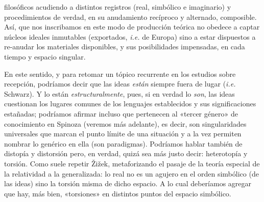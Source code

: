 filosóficos acudiendo a distintos registros (real, simbólico e imaginario) y procedimientos de verdad, en su anudamiento recíproco y alternado, composible. Así, que nos inscribamos en este modo de producción teórica no obedece a captar núcleos ideales inmutables (exportados, \emph{i.e.} de Europa) sino a estar dispuestos a re-anudar los materiales disponibles, y sus posibilidades impensadas, en cada tiempo y espacio singular.

En este sentido, y para retomar un tópico recurrente en los estudios sobre recepción, podríamos decir que las ideas \emph{están} siempre fuera de lugar (\emph{i.e.} Schwarz). Y lo están \emph{estructuralmente}, pues, si en verdad lo \emph{son}, las ideas cuestionan los lugares comunes de los lenguajes establecidos y sus significaciones estañadas; podríamos afirmar incluso que pertenecen al «tercer género» de conocimiento en Spinoza (veremos más adelante), es decir, son singularidades universales que marcan el punto límite de una situación y a la vez permiten nombrar lo genérico en ella (son paradigmas). Podríamos hablar también de distopía y distorsión pero, en verdad, quizá sea más justo decir: heterotopía y torsión. Como suele repetir Žižek, metaforizando el pasaje de la teoría especial de la relatividad a la generalizada: lo real no es un agujero en el orden simbólico (de las ideas) sino la torsión misma de dicho espacio. A lo cual deberíamos agregar que hay, más bien, «torsiones» en distintos puntos del espacio simbólico.

